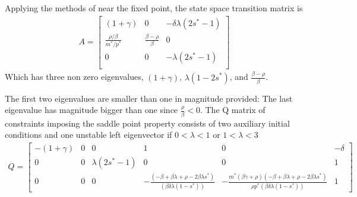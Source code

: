 \documentclass[12pt]{article}
\begin{document}
Applying the methods of \cite{ANDER:AIM2} near the fixed point, the state space transition matrix is
\begin{gather*}
A=\left [
\begin{array}{ccc}
               (1+ \gamma )  &       0&-\delta \lambda (2 s^\ast - 1)\\
   \frac{\rho / \beta}{m^\ast /p^\ast}&\frac{\beta - \rho}{\beta}&0\\
0&0&-\lambda (2s^\ast -1)\\
\end{array}
\right ]
\end{gather*}
Which has three non zero eigenvalues, $(1+\gamma)$, $\lambda (1 - 2 s^\ast)$, and  $\frac{\beta - \rho}{\beta}$.

 The first two eigenvalues are smaller than one in magnitude provided:
 The last eigenvalue has magnitude bigger than one since $\frac{\rho}{\beta}<0$.
The Q matrix of constraints imposing the saddle point property
 consists of two auxiliary initial conditions and one unstable left eigenvector
if  $0<\lambda<1 \text{ or } 1 < \lambda < 3$ 
\begin{gather*}
Q=
\left [
\begin{array}{cccccc}
                 -(1+ \gamma )&  0 &0&1  &     0&-\delta\\
0&0&\lambda ( 2 s^\ast -1)&0&0&1\\
0&0&0&-\frac{(-\beta + \beta \lambda + \rho - 2 \beta \lambda s^\ast)}
{(\beta \delta \lambda(1 - s^\ast))}&
-\frac{m^\ast(\beta \gamma+\rho)(-\beta + \beta \lambda + \rho - 2 \beta \lambda s^\ast)}
{\rho p^\ast (\beta \delta \lambda(1 - s^\ast))}&
1
\end{array}
\right ]
\end{gather*}
\end{document}
